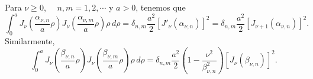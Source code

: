 \begin{tcolorbox}
Para $\nu\ge 0$, $\quad n,m=1,2,\cdots$ y $a>0$, tenemos que
\begin{equation}\label{roJnualpha}
\int_0^a J_\nu\left(\frac{\alpha_{\nu,n}}{a}\rho\right)J_\nu\left(\frac{\alpha_{\nu,m}}{a}\rho\right)\rho \, d\rho =\delta_{n,m}\frac{a^2}{2}\left[J'_{\nu}(\alpha_{\nu,n})\right]^2 =\delta_{n,m}\frac{a^2}{2}\left[J_{\nu+1}(\alpha_{\nu,n})\right]^2.
\end{equation}
Similarmente,
\begin{equation}\label{roJnubeta}
\int_0^a J_\nu\left(\frac{\beta_{\nu,n}}{a}\rho\right)J_\nu\left(\frac{\beta_{\nu,m}}{a}\rho\right)\rho \, d\rho=\delta_{n,m}\frac{a^2}{2}\left(1-\frac{\nu^2}{\beta_{\nu,n}^2}\right)\left[J_\nu(\beta_{\nu,n})\right]^2.
\end{equation}
\end{tcolorbox}

